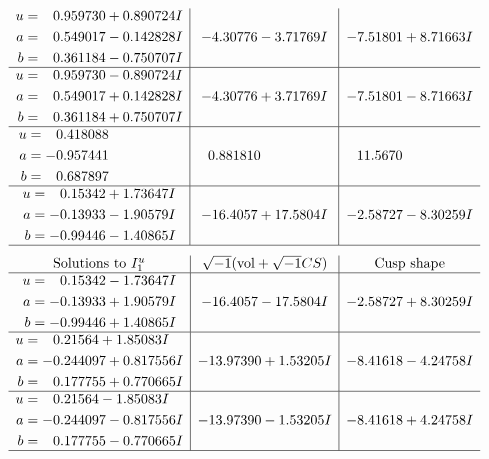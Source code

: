 \documentclass[1p]{elsarticle_modified}
\theoremstyle{definition}
\newcommand{\I}{\sqrt{-1}}
\begin{document}
$$\begin{array}{c|c|c}
\begin{aligned}
u &= \phantom{-}0.959730 + 0.890724 I \\
a &= \phantom{-}0.549017 - 0.142828 I \\
b &= \phantom{-}0.361184 - 0.750707 I\end{aligned}
 & -4.30776 - 3.71769 I & -7.51801 + 8.71663 I \\ \hline\begin{aligned}
u &= \phantom{-}0.959730 - 0.890724 I \\
a &= \phantom{-}0.549017 + 0.142828 I \\
b &= \phantom{-}0.361184 + 0.750707 I\end{aligned}
 & -4.30776 + 3.71769 I & -7.51801 - 8.71663 I \\ \hline\begin{aligned}
u &= \phantom{-}0.418088\phantom{ +0.000000I} \\
a &= -0.957441\phantom{ +0.000000I} \\
b &= \phantom{-}0.687897\phantom{ +0.000000I}\end{aligned}
 & \phantom{-}0.881810\phantom{ +0.000000I} & \phantom{-}11.5670\phantom{ +0.000000I} \\ \hline\begin{aligned}
u &= \phantom{-}0.15342 + 1.73647 I \\
a &= -0.13933 - 1.90579 I \\
b &= -0.99446 - 1.40865 I\end{aligned}
 & -16.4057 + 17.5804 I & -2.58727 - 8.30259 I\\
 \hline 
 \end{array}$$\newpage$$\begin{array}{c|c|c}  
\text{Solutions to }I^u_{1}& \I (\text{vol} + \sqrt{-1}CS) & \text{Cusp shape}\\
 \hline 
\begin{aligned}
u &= \phantom{-}0.15342 - 1.73647 I \\
a &= -0.13933 + 1.90579 I \\
b &= -0.99446 + 1.40865 I\end{aligned}
 & -16.4057 - 17.5804 I & -2.58727 + 8.30259 I \\ \hline\begin{aligned}
u &= \phantom{-}0.21564 + 1.85083 I \\
a &= -0.244097 + 0.817556 I \\
b &= \phantom{-}0.177755 + 0.770665 I\end{aligned}
 & -13.97390 + 1.53205 I & -8.41618 - 4.24758 I \\ \hline\begin{aligned}
u &= \phantom{-}0.21564 - 1.85083 I \\
a &= -0.244097 - 0.817556 I \\
b &= \phantom{-}0.177755 - 0.770665 I\end{aligned}
 & -13.97390 - 1.53205 I & -8.41618 + 4.24758 I\\
 \hline 
 \end{array}$$\newpage\newpage\renewcommand{\arraystretch}{1}
\end{document}
